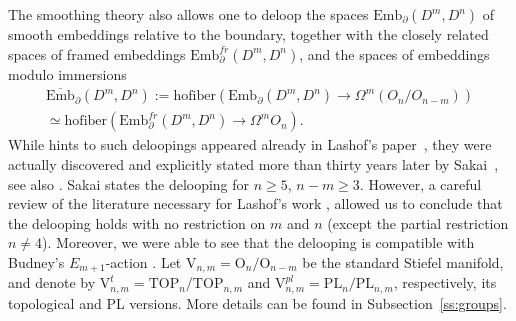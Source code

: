 \documentclass[11pt]{amsart}
\theoremstyle{definition}
\newcommand{\Ebarmn}{{\overline{\mathrm{Emb}}}_\partial(D^m,D^n)}
\newcommand{\Embmn}{\mathrm{Emb}_\partial(D^m,D^n)}
\newcommand{\Embfrmn}{\mathrm{Emb}_\partial^{fr}(D^m,D^n)}
\newcommand{\PL}{\mathrm{PL}}
\newcommand{\TOP}{\mathrm{TOP}}
\newcommand{\OO}{\mathrm{O}}
\newcommand{\VV}{\mathrm{V}}
\newcommand{\hofiber}{\mathrm{hofiber}}
\numberwithin{equation}{section}
\begin{document}
The smoothing theory also allows one to deloop the  spaces $\Embmn$ of smooth embeddings relative to the boundary, together with the closely related spaces of framed embeddings $\Embfrmn$, and the spaces of embeddings modulo immersions 
\begin{multline*}
\Ebarmn:=\hofiber(\Embmn\to \Omega^m(O_n/O_{n-m}))\\
\simeq\hofiber(\Embfrmn\to\Omega^mO_n).
\end{multline*}
While hints to such deloopings appeared already in Lashof's paper~\cite{Lashof}, they were actually discovered and explicitly stated more than thirty years later by Sakai~\cite{Sakai}, see also
\cite[Proposition~5.1]{DTW}. Sakai states the delooping for $n\geq 5$, $n-m\geq 3$. However, a careful review of the literature necessary for Lashof's work  \cite{Lashof}, allowed us to conclude that the delooping holds with no restriction on $m$ and $n$ (except the partial restriction $n\neq 4$). Moreover, we were able to see that the delooping is compatible with Budney's $E_{m+1}$-action \cite{Budney_cubes}. 
Let $\VV_{n,m}=\OO_n/\OO_{n-m}$ be the standard Stiefel manifold, and denote by $\VV^t_{n,m}=\TOP_n/\TOP_{n,m}$ and 
$\VV^{pl}_{n,m} = \PL_n/\PL_{n,m}$, respectively, its topological and PL versions. More details can be found in Subsection~\ref{ss:groups}.
\end{document}
